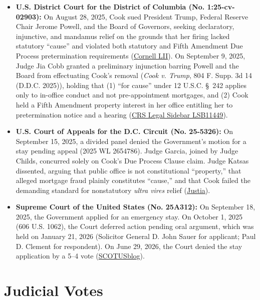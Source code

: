 \documentclass[12pt]{article}
\begin{document}
\begin{itemize}
    \item \textbf{U.S. District Court for the District of Columbia (No. 1:25-cv-02903):} On August 28, 2025, Cook sued President Trump, Federal Reserve Chair Jerome Powell, and the Board of Governors, seeking declaratory, injunctive, and mandamus relief on the grounds that her firing lacked statutory ``cause'' and violated both statutory and Fifth Amendment Due Process pretermination requirements (\href{https://www.law.cornell.edu/supremecourt/text/25A312}{Cornell LII}). On September 9, 2025, Judge Jia Cobb granted a preliminary injunction barring Powell and the Board from effectuating Cook's removal (\textit{Cook v. Trump}, 804 F. Supp. 3d 14 (D.D.C. 2025)), holding that (1) ``for cause'' under 12 U.S.C. \S~242 applies only to in-office conduct and not pre-appointment mortgages, and (2) Cook held a Fifth Amendment property interest in her office entitling her to pretermination notice and a hearing (\href{https://www.everycrsreport.com/reports/LSB11449.html}{CRS Legal Sidebar LSB11449}).
    \item \textbf{U.S. Court of Appeals for the D.C. Circuit (No. 25-5326):} On September 15, 2025, a divided panel denied the Government's motion for a stay pending appeal (2025 WL 2654786). Judge Garcia, joined by Judge Childs, concurred solely on Cook's Due Process Clause claim. Judge Katsas dissented, arguing that public office is not constitutional ``property,'' that alleged mortgage fraud plainly constitutes ``cause,'' and that Cook failed the demanding standard for nonstatutory \textit{ultra vires} relief (\href{https://supreme.justia.com/cases/federal/us/609/25a312/}{Justia}).
    \item \textbf{Supreme Court of the United States (No. 25A312):} On September 18, 2025, the Government applied for an emergency stay. On October 1, 2025 (606 U.S. 1062), the Court deferred action pending oral argument, which was held on January 21, 2026 (Solicitor General D. John Sauer for applicant; Paul D. Clement for respondent). On June 29, 2026, the Court denied the stay application by a 5--4 vote (\href{https://www.scotusblog.com/2026/06/court-prevents-trump-from-firing-fed-governor/}{SCOTUSblog}).
\end{itemize}

\section{Judicial Votes}
\end{document}
